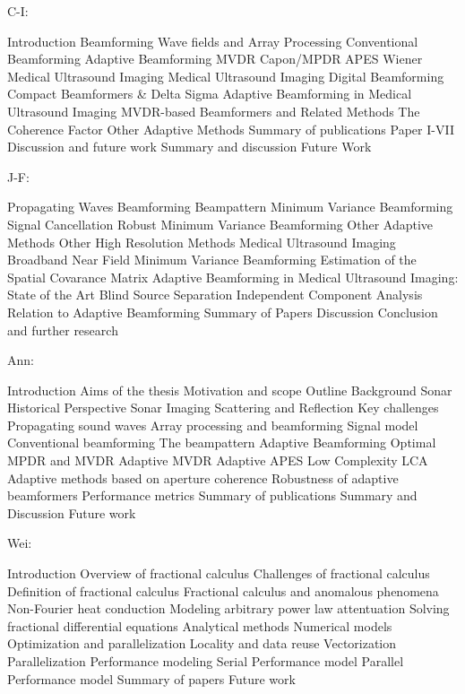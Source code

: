 C-I:

Introduction
   Beamforming
   Wave fields and Array Processing
   Conventional Beamforming
   Adaptive Beamforming
      MVDR
      Capon/MPDR
      APES
      Wiener
   Medical Ultrasound Imaging
   Medical Ultrasound Imaging
   Digital Beamforming
      Compact Beamformers \& Delta Sigma
      Adaptive Beamforming in Medical Ultrasound Imaging
         MVDR-based Beamformers and Related Methods
         The Coherence Factor
         Other Adaptive Methods
Summary of publications
   Paper I-VII
Discussion and future work
   Summary and discussion
   Future Work

   
J-F:

Propagating Waves
Beamforming
  Beampattern
Minimum Variance Beamforming
  Signal Cancellation
  Robust Minimum Variance Beamforming
  Other Adaptive Methods
  Other High Resolution Methods
Medical Ultrasound Imaging
  Broadband Near Field Minimum Variance Beamforming
  Estimation of the Spatial Covarance Matrix
Adaptive Beamforming in Medical Ultrasound Imaging: State of the Art
Blind Source Separation
  Independent Component Analysis
  Relation to Adaptive Beamforming
Summary  of Papers
Discussion
Conclusion and further research

Ann:

Introduction
   Aims of the thesis
   Motivation and scope
   Outline
Background
   Sonar
      Historical Perspective
      Sonar Imaging
      Scattering and Reflection
      Key challenges
   Propagating sound waves
   Array processing and beamforming
      Signal model
      Conventional beamforming
      The beampattern
   Adaptive Beamforming
      Optimal MPDR and MVDR
      Adaptive MVDR
      Adaptive APES
      Low Complexity LCA
      Adaptive methods based on aperture coherence
      Robustness of adaptive beamformers
   Performance metrics
Summary of publications
Summary and Discussion
Future work

Wei:

Introduction
   Overview of fractional calculus
   Challenges of fractional calculus
   Definition of fractional calculus
   Fractional calculus and anomalous phenomena
      Non-Fourier heat conduction
      Modeling arbitrary power law attentuation
   Solving fractional differential equations
      Analytical methods
      Numerical models
   Optimization and parallelization
      Locality and data reuse
      Vectorization
      Parallelization
   Performance modeling
      Serial Performance model
      Parallel Performance model
Summary of papers
Future work
   
